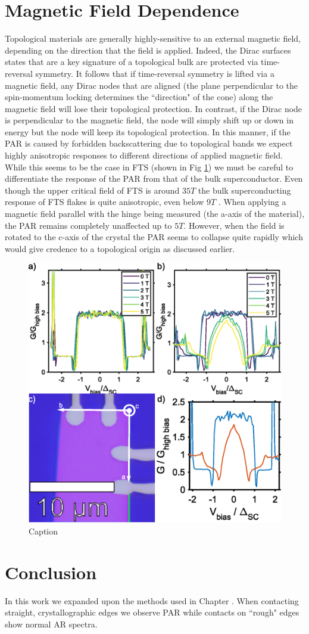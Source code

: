 \section{Magnetic Field Dependence}
Topological materials are generally highly-sensitive to an external magnetic field, depending on the direction that the field is applied. Indeed, the Dirac surfaces states that are a key signature of a topological bulk are protected via time-reversal symmetry. It follows that if time-reversal symmetry is lifted via a magnetic field, any Dirac nodes that are aligned (the plane perpendicular to the spin-momentum locking determines the ``direction" of the cone) along the magnetic field will lose their topological protection. In contrast, if the Dirac node is perpendicular to the magnetic field, the node will simply shift up or down in energy but the node will keep its topological protection. In this manner, if the \ac{PAR} is caused by forbidden backscattering due to topological bands we expect highly anisotropic responses to different directions of applied magnetic field. While this seems to be the case in \ac{FTS} (shown in Fig \ref{fig:PARField}) we must be careful to differentiate the response of the \ac{PAR} from that of the bulk superconductor. Even though the upper critical field of \ac{FTS} is around $35 T$  the bulk superconducting response of \ac{FTS} flakes is quite anisotropic, even below $9 T$ \cite{zalic2019}. When applying a magnetic field parallel with the hinge being measured (the a-axis of the material), the \ac{PAR} remains completely unaffected up to $5 T$. However, when the field is rotated to the c-axis of the crystal the \ac{PAR} seems to collapse quite rapidly which would give credence to a topological origin as discussed earlier. 
\begin{figure}[h]
    \centering
    \includegraphics[width = \textwidth]{Chap4/Figures/MagneticField.eps}
    \caption{Caption}
    \label{fig:PARField}
\end{figure}
\section{Conclusion}
In this work we expanded upon the methods used in Chapter . When contacting straight, crystallographic edges we observe \acl{PAR} while contacts on ``rough" edges show normal \acl{AR} spectra. 